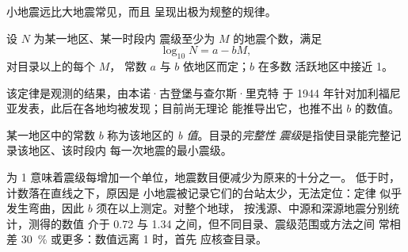 小地震远比大地震常见，而且
呈现出极为规整的规律。

\begin{proposition}\label{prop:b1:earthquake-source:gutenberg-richter}
设 $N$ 为某一地区、某一时段内
震级至少为 $M$ 的地震个数，满足
\[
  \log_{10} N = a - bM ,
\]
对目录以上的每个 $M$，
常数 $a$ 与 $b$ 依地区而定；$b$ 在多数
活跃地区中接近 1。
\end{proposition}
\admitted

该定律是观测的结果，由本诺·古登堡与查尔斯·里克特
于 1944 年针对加利福尼亚发表，此后在各地均被发现；目前尚无理论
能推导出它，也推不出 $b$ 的数值。

\begin{definition}[b 值、完整性震级]\label{def:b1:earthquake-source:b-value}
某一地区中的常数 $b$ 称为该地区的
\emph{b 值}。目录的\emph{完整性
震级}是指使目录能完整记录该地区、该时段内
每一次地震的最小震级。
\end{definition}

为 1 意味着震级每增加一个单位，地震数目便减少为原来的十分之一。
低于时，计数落在直线之下，原因是
小地震被记录它们的台站太少，无法定位：定律
似乎发生弯曲，因此 $b$ 须在以上测定。对整个地球，
按浅源、中源和深源地震分别统计，测得的数值
介于 0.72 与 1.34 之间，但不同目录、震级范围或方法之间
常相差 \qty{30}{\percent} 或更多：数值远离 1 时，首先
应核查目录。

